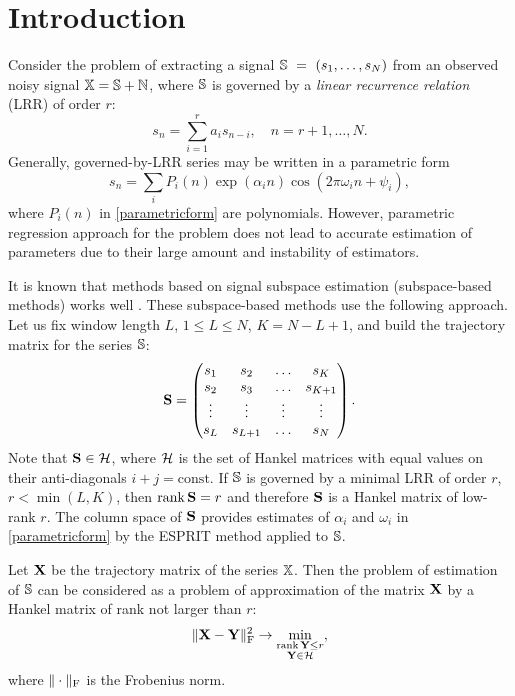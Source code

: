 \documentclass[sii]{ipart}
\def\rank{\mathop{\mathrm{rank}}}
\begin{document}
\section{Introduction}
Consider the problem of extracting a signal $\mathbb{S}~=~(s_1, \ldots, s_N)$ from an observed noisy signal $\mathbb{X} = \mathbb{S} + \mathbb{N}$, where $\mathbb{S}$ is governed by a \emph{linear recurrence relation} (LRR) of order $r$:
\begin{equation*}
s_n = \sum_{i = 1}^{r} a_i s_{n-i}, \quad n = r + 1, \ldots, N.
\end{equation*}
Generally, governed-by-LRR series may be written in a parametric form
\begin{equation} \label{parametricform}
s_n = \sum_i P_i(n) \exp(\alpha_i n) \cos(2 \pi \omega_i n + \psi_i),
\end{equation}
where $P_i(n)$ in \eqref{parametricform} are polynomials. However, parametric regression approach for the problem does not lead to accurate estimation of parameters due to their large amount and instability of estimators.

It is known that methods based on signal subspace estimation (subspace-based methods) works well \cite{Broomhead.King1986, Vautard.etal1992, Elsner.Tsonis1996, Golyandina.etal2001}. These subspace-based methods use the following approach. Let us fix window length $L$, $1 \le L \le N$, $K = N - L + 1$, and build the trajectory matrix for the series $\mathbb{S}$:
\begin{equation*}
\bfS = \begin{pmatrix}
s_1 & s_2 & \ldots & s_K \\
s_2 & s_3 & \ldots & s_{K + 1} \\
\vdots & \vdots & \vdots & \vdots \\
s_L & s_{L + 1} & \ldots & s_N
\end{pmatrix}.
\end{equation*}
Note that $\mathbf{S}\in \mathcal{H}$, where $\mathcal{H}$ is the set of Hankel matrices with equal values on their anti-diagonals $i+j=\mathrm{const}$.
If $\mathbb{S}$ is governed by a minimal LRR of order $r$, $r < \min(L, K)$, then $\rank \bfS = r$ and therefore $\mathbf{S}$ is a Hankel matrix of low-rank $r$. The column space of $\mathbf{S}$ provides estimates of $\alpha_i$ and $\omega_i$ in \eqref{parametricform} by the ESPRIT method applied to $\mathbb{S}$.

Let $\mathbf{X}$ be the trajectory matrix of the series $\mathbb{X}$. Then the problem of estimation of $\mathbb{S}$ can be considered as a problem of approximation of the matrix $\mathbf{X}$ by a Hankel matrix of rank not larger than $r$:
\begin{equation}\label{introd_task}
\|\bfX - \bfY\|^2_\rmF \to \min_{\substack{\rank \bfY \le r \\ \bfY \in \calH}},
\end{equation}
where $\|\cdot\|_{\mathrm{F}}$ is the Frobenius norm.
\end{document}
